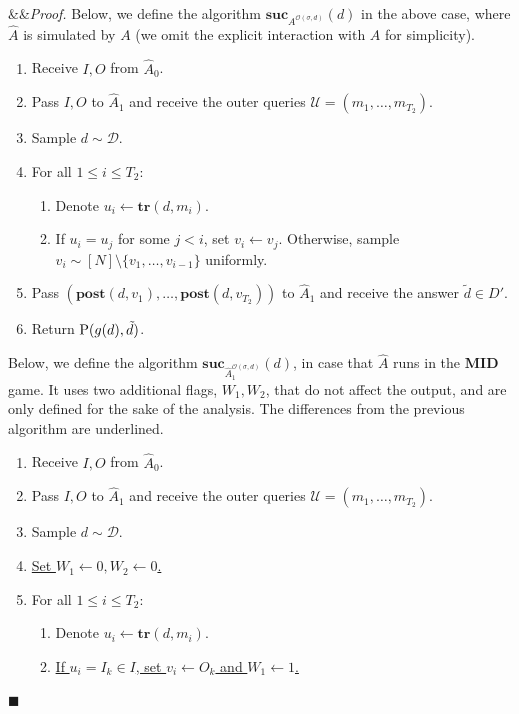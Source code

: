 \documentclass[11pt]{article}
\renewenvironment{proof}[1][]
    {\noindent
       \ifx&#1&{\it Proof.}
       \else{\it Proof ({#1}).}
       \fi}{\hfill $\blacksquare$}
\newcommand{\SECS}{{\mathcal{D}}}
\newcommand{\secv}{{d}}
\newcommand{\SECV}{{D}}
\newcommand{\calO}{\mathcal{O}}
\newcommand{\SUC}{\boldsymbol{suc}}
\newcommand{\TR}{\boldsymbol{tr}}
\newcommand{\POST}{\boldsymbol{post}}
\newcommand{\MID}{\boldsymbol{MID}}
\newcommand{\INP}{I}
\newcommand{\OUTP}{O}
\begin{document}
\begin{proof}
    Below, we define the algorithm $\SUC_{A^{ \mathcal{\calO}(\sigma,\secv)} }(\secv)$ 
    in the above case, where $\widehat{A}$ is simulated by $A$ (we omit the explicit interaction with $A$ for simplicity).
    \begin{enumerate}
        \item Receive $\INP,\OUTP$ from $\widehat{A}_0$.
        \item Pass $\INP,\OUTP$ to $\widehat{A}_1$ and receive the outer queries $\mathcal{U} = (m_1,\dots,m_{T_2})$.
        \item Sample $\secv \sim \SECS$.
        \item For all $1 \le i \le T_2$:
        \begin{enumerate}
            \item Denote $u_i \leftarrow \TR(\secv,m_i)$.
            \item If $u_i = u_j$ for some $j < i$, set $v_i \leftarrow v_j$. 
            Otherwise, sample $v_i \sim [N]\setminus \{v_1,\dots,v_{i-1}\}$ uniformly.
        \end{enumerate}
        \item Pass $(\POST(\secv,v_1),\dots,\POST(\secv,v_{T_2}))$ to $\widehat{A}_1$ and receive the answer 
        $\tilde{\secv} \in \SECV'$.
        \item Return $\textup{P}(g(\secv),\tilde{\secv})$.
    \end{enumerate}
      Below, we define the algorithm $\SUC_{\widehat{A}_1^{ \mathcal{\calO}(\sigma,\secv)} }(\secv)$,
      in case that $\widehat{A}$ runs in the $\MID$ game.
     It uses two additional flags, $W_1,W_2$, that do not affect the output, and are only defined for the sake of the analysis. The differences from the previous algorithm are underlined. 
    \begin{enumerate}
    \item Receive $\INP,\OUTP$ from $\widehat{A}_0$.
        \item Pass $\INP,\OUTP$ to $\widehat{A}_1$ and receive the outer queries $\mathcal{U} = (m_1,\dots,m_{T_2})$.
        \item Sample $\secv \sim \SECS$.
        \item \underline{Set $W_1 \leftarrow 0, W_2 \leftarrow 0$.} 
        \item For all $1 \le i \le T_2$:
        \begin{enumerate}
            \item Denote $u_i \leftarrow \TR(\secv,m_i)$.
            \item \underline{If $u_i = \INP_k \in \INP$, set $v_i \leftarrow \OUTP_k$ and $W_1 \leftarrow 1$.
}
\end{enumerate}
\end{enumerate}
\end{proof}
\end{document}
